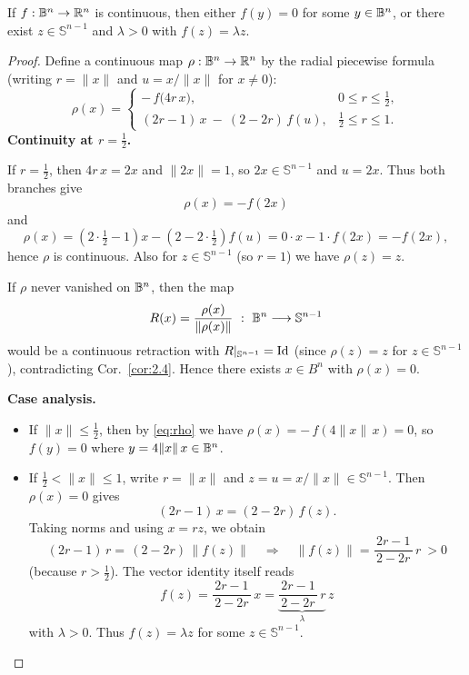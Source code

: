 \begin{corollary}\label{cor:2.11}
If $f:\mathbb{B}^n\to\Bbb R^n$ is continuous, then either $f(y)=0$ for some $y\in \mathbb{B}^n$,
or there exist $z\in \mathbb{S}^{n-1}$ and $\lambda>0$ with $f(z)=\lambda z$.
\end{corollary}
\begin{proof}
Define a continuous map $\rho:\mathbb{B}^n\to\Bbb R^n$ by the radial piecewise formula
(writing $r=\|x\|$ and $u=x/\|x\|$ for $x\neq 0$):
\[
\rho(x)=
\begin{cases}
-\,f\bigl(4r\,x\bigr), & 0\le r\le \tfrac12,\\[4pt]
(2r-1)\,x\ -\ (2-2r)\,f(u), & \tfrac12\le r\le 1.
\end{cases}
\tag{$*$}\label{eq:rho}
\]
\textbf{Continuity at $r=\tfrac12$.}

If $r=\tfrac12$, then $4r\,x=2x$ and
$\|2x\|=1$, so $2x\in \mathbb{S}^{n-1}$ and $u=2x$. Thus both branches give
\[\rho(x)=-f(2x)\] and \[\rho(x)=(2\cdot\tfrac12-1)x-(2-2\cdot\tfrac12)f(u)
=0\cdot x-1\cdot f(2x)=-f(2x),\] 
hence $\rho$ is continuous. Also
for $z\in \mathbb{S}^{n-1}$ (so $r=1$) we have $\rho(z)=z$.

If $\rho$ never vanished on $\mathbb{B}^n$, then the map
\[
R(x)=\dfrac{\rho(x)}{\|\rho(x)\|}\ :\ \B^n\longrightarrow \mathbb{S}^{n-1}
\]
would be a continuous retraction with $R|_{\mathbb{S}^{n-1}}=\operatorname{Id}$ (since
$\rho(z)=z$ for $z\in \mathbb{S}^{n-1}$), contradicting Cor.~\ref{cor:2.4}.
Hence there exists $x\in B^n$ with $\rho(x)=0$.

\smallskip
\textbf{Case analysis.}
\begin{itemize}
\item If $\|x\|\le \tfrac12$, then by \eqref{eq:rho} we have
$\rho(x)= -\,f(4\|x\|\,x)=0$, so $f(y)=0$ where $y=4\|x\|\,x\in \mathbb{B}^n$.

\item If $\tfrac12<\|x\|\le 1$, write $r=\|x\|$ and $z=u=x/\|x\| \in \mathbb{S}^{n-1}$.
Then $\rho(x)=0$ gives
\[
(2r-1)\,x=(2-2r)\,f(z).
\]
Taking norms and using $x=r z$, we obtain
\[
(2r-1)\,r=\,(2-2r)\,\|f(z)\|\quad\Longrightarrow\quad
\|f(z)\|=\dfrac{2r-1}{\,2-2r\,}\,r\ >0
\]
(because $r>\tfrac12$). The vector identity itself reads
\[
f(z)=\dfrac{2r-1}{\,2-2r\,}\,x=\underbrace{\dfrac{2r-1}{\,2-2r\,}\,r}_{\displaystyle \lambda}\, z
\]
with $\lambda>0$. Thus $f(z)=\lambda z$ for some $z\in \mathbb{S}^{n-1}$.
\end{itemize}
\end{proof}

